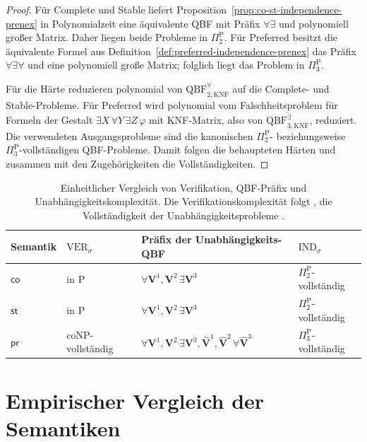 \begin{proof}
    Für Complete und Stable liefert
    Proposition~\ref{prop:co-st-independence-prenex} in Polynomialzeit eine
    äquivalente QBF mit Präfix \(\forall\exists\) und polynomiell großer
    Matrix. Daher liegen beide Probleme in \(\Pi^{\mathrm P}_2\). Für
    Preferred besitzt die äquivalente Formel aus
    Definition~\ref{def:preferred-independence-prenex} das Präfix
    \(\forall\exists\forall\) und eine polynomiell große Matrix; folglich
    liegt das Problem in \(\Pi^{\mathrm P}_3\).

    Für die Härte reduzieren
    \textcite[Propositionen~C.1--C.4]
    {bluemel:2025:independence-aba} polynomial von
    \(\mathrm{QBF}^{\forall}_{2,\mathrm{KNF}}\) auf die Complete- und
    Stable-Probleme. Für Preferred wird polynomial vom Falschheitsproblem
    für Formeln der Gestalt
    \(\exists X\,\forall Y\,\exists Z\,\varphi\) mit KNF-Matrix, also von
    \(\overline{\mathrm{QBF}^{\exists}_{3,\mathrm{KNF}}}\), reduziert.
    Die verwendeten Ausgangsprobleme sind die kanonischen
    \(\Pi^{\mathrm P}_2\)- beziehungsweise
    \(\Pi^{\mathrm P}_3\)-vollständigen QBF-Probleme. Damit folgen die
    behaupteten Härten und zusammen mit den Zugehörigkeiten die
    Vollständigkeiten.
\end{proof}

\begin{table}[tb]
    \centering
    \caption{Einheitlicher Vergleich von Verifikation, QBF-Präfix und
    Unabhängigkeitskomplexität. Die Verifikationskomplexität folgt
    \textcite[Tabelle~3.1]{dvorak:2012:computational-aspects}, die
    Vollständigkeit der Unabhängigkeitsprobleme
    \textcite[Proposition~C.4]{bluemel:2025:independence-aba}.}
    \label{tab:independence-complexity-comparison}
    \small
    \begin{tabular}{llll}
        \toprule
        Semantik
        & \(\mathrm{VER}_\sigma\)
        & Präfix der Unabhängigkeits-QBF
        & \(\mathrm{IND}_\sigma\) \\
        \midrule
        \(\mathsf{co}\)
        & in \(\mathrm P\)
        & \(\forall\mathbf V^1,\mathbf V^2\,
             \exists\mathbf V^3\)
        & \(\Pi^{\mathrm P}_2\)-vollständig \\
        \(\mathsf{st}\)
        & in \(\mathrm P\)
        & \(\forall\mathbf V^1,\mathbf V^2\,
             \exists\mathbf V^3\)
        & \(\Pi^{\mathrm P}_2\)-vollständig \\
        \(\mathsf{pr}\)
        & \(\mathrm{coNP}\)-vollständig
        & \(\forall\mathbf V^1,\mathbf V^2\,
             \exists\mathbf V^3,\widehat{\mathbf V}^{1},
             \widehat{\mathbf V}^{2}\,
             \forall\widehat{\mathbf V}^{3}\)
        & \(\Pi^{\mathrm P}_3\)-vollständig \\
        \bottomrule
    \end{tabular}
\end{table}

\section{Empirischer Vergleich der Semantiken}
\label{sec:empirical-independence-occurrence}